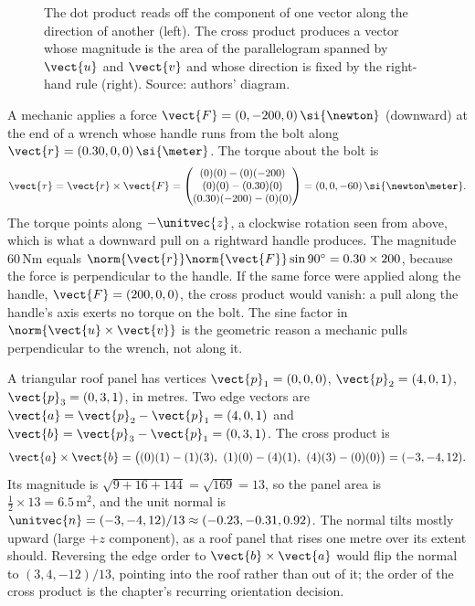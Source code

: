 \begin{figure}[h]
  \centering
  
  \caption[Dot product as projection; cross product as oriented
  parallelogram.]{The dot product reads off the component of one vector
  along the direction of another (left). The cross product produces a
  vector whose magnitude is the area of the parallelogram spanned by
  $\vect{u}$ and $\vect{v}$ and whose direction is fixed by the
  right-hand rule (right). Source: authors' diagram.}
  \label{fig:vol02:ch08:dot-cross}
\end{figure}

\begin{example}
A mechanic applies a force $\vect{F} = (0, -200, 0)\,\si{\newton}$
(downward) at the end of a wrench whose handle runs from the bolt
along $\vect{r} = (0.30, 0, 0)\,\si{\meter}$. The torque about the
bolt is
\[
\vect{\tau} = \vect{r}\times\vect{F} =
\begin{pmatrix}
(0)(0) - (0)(-200) \\
(0)(0) - (0.30)(0) \\
(0.30)(-200) - (0)(0)
\end{pmatrix}
= (0, 0, -60)\,\si{\newton\meter}.
\]
The torque points along $-\unitvec{z}$, a clockwise rotation seen from
above, which is what a downward pull on a rightward handle produces.
The magnitude $60\,\si{\newton\meter}$ equals $\norm{\vect{r}}
\norm{\vect{F}}\sin 90^{\circ} = 0.30\times 200$, because the force is
perpendicular to the handle. If the same force were applied along the
handle, $\vect{F} = (200, 0, 0)$, the cross product would vanish: a
pull along the handle's axis exerts no torque on the bolt. The
sine factor in $\norm{\vect{u}\times\vect{v}}$ is the geometric
reason a mechanic pulls perpendicular to the wrench, not along it.
\end{example}

\begin{example}
A triangular roof panel has vertices $\vect{p}_{1} = (0, 0, 0)$,
$\vect{p}_{2} = (4, 0, 1)$, $\vect{p}_{3} = (0, 3, 1)$, in metres.
Two edge vectors are $\vect{a} = \vect{p}_{2} - \vect{p}_{1} =
(4, 0, 1)$ and $\vect{b} = \vect{p}_{3} - \vect{p}_{1} = (0, 3, 1)$.
The cross product is
\[
\vect{a}\times\vect{b} =
\big((0)(1) - (1)(3),\ (1)(0) - (4)(1),\ (4)(3) - (0)(0)\big)
= (-3, -4, 12).
\]
Its magnitude is $\sqrt{9 + 16 + 144} = \sqrt{169} = 13$, so the
panel area is $\tfrac{1}{2}\times 13 = 6.5\,\si{\meter\squared}$, and
the unit normal is $\unitvec{n} = (-3, -4, 12)/13 \approx
(-0.23, -0.31, 0.92)$. The normal tilts mostly upward (large
$+z$ component), as a roof panel that rises one metre over its
extent should. Reversing the edge order to $\vect{b}\times\vect{a}$
would flip the normal to $(3, 4, -12)/13$, pointing into the roof
rather than out of it; the order of the cross product is the
chapter's recurring orientation decision.
\end{example}

